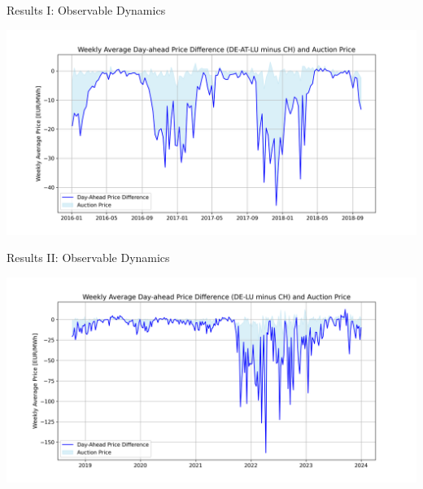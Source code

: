 \documentclass[aspectratio=169,xcolor=dvipsnames]{beamer}
\begin{document}
\begin{frame}{Results I: Observable Dynamics}
    \begin{center}
        \includegraphics[width=\textwidth]{figures/weekly_average_day_ahead_price_diff_de-lu-at_ch.png}
    \end{center}
\end{frame}

\begin{frame}{Results II: Observable Dynamics}
    \begin{center}
        \includegraphics[width=\textwidth]{figures/weekly_average_day_ahead_price_diff_de-lu_ch.png}
    \end{center}
\end{frame}
\end{document}
